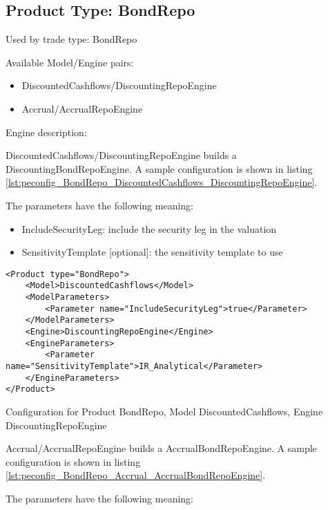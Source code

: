 \subsection{Product Type: BondRepo}

Used by trade type: BondRepo

Available Model/Engine pairs:

\begin{itemize}
\item DiscountedCashflows/DiscountingRepoEngine
\item Accrual/AccrualRepoEngine
\end{itemize}

Engine description:

DiscountedCashflows/DiscountingRepoEngine builds a DiscountingBondRepoEngine. A sample configuration is shown in listing
\ref{lst:peconfig_BondRepo_DiscountedCashflows_DiscountingRepoEngine}.

The parameters have the following meaning:

\begin{itemize}
\item IncludeSecurityLeg: include the security leg in the valuation
\item SensitivityTemplate [optional]: the sensitivity template to use 
\end{itemize}

\begin{longlisting}
\begin{verbatim}
<Product type="BondRepo">
    <Model>DiscountedCashflows</Model>
    <ModelParameters>
        <Parameter name="IncludeSecurityLeg">true</Parameter>
    </ModelParameters>
    <Engine>DiscountingRepoEngine</Engine>
    <EngineParameters>
        <Parameter name="SensitivityTemplate">IR_Analytical</Parameter>
    </EngineParameters>
</Product>
\end{verbatim}
\caption{Configuration for Product BondRepo, Model DiscountedCashflows, Engine DiscountingRepoEngine}
\label{lst:peconfig_BondRepo_DiscountedCashflows_DiscountingRepoEngine}
\end{longlisting}

Accrual/AccrualRepoEngine builds a AccrualBondRepoEngine. A sample configuration is shown in listing
\ref{lst:peconfig_BondRepo_Accrual_AccrualBondRepoEngine}.

The parameters have the following meaning:

